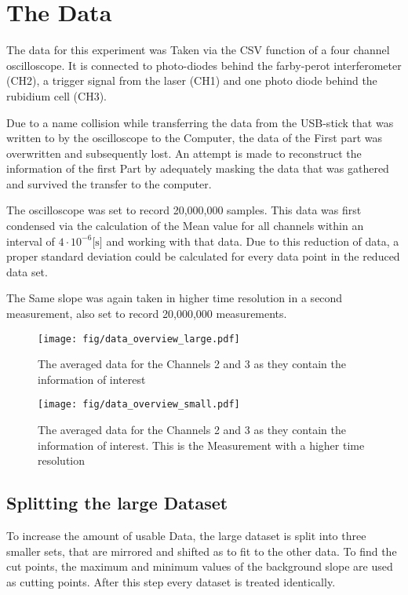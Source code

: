 \section{The Data}
The data for this experiment was Taken via the CSV function of a four channel oscilloscope. It is connected to photo-diodes behind the farby-perot
interferometer (CH2), a trigger signal from the laser (CH1) and one photo diode behind the rubidium cell (CH3).

Due to a name collision while transferring the data from the USB-stick that was written to by the oscilloscope to the Computer, the data of the First
part was overwritten and subsequently lost. An attempt is made to reconstruct the information of the first Part by adequately masking the data that
was gathered and survived the transfer to the computer.

The oscilloscope was set to record 20,000,000 samples. This data was first condensed via the calculation of the Mean value for all channels within an
interval of $4\cdot 10^{-6} \text{[s]}$ and working with that data. Due to this reduction of data, a proper standard deviation could be calculated for
every data point in the reduced data set.

The Same slope was again taken in higher time resolution in a second measurement, also set to record 20,000,000 measurements.

\begin{figure}[tb]
	\texttt{[image: fig/data\_overview\_large.pdf]}
	\caption{The averaged data for the Channels 2 and 3 as they contain the information of interest}
	\label{fig:data_overview_large}
\end{figure}

\begin{figure}[tb]
	\texttt{[image: fig/data\_overview\_small.pdf]}
	\caption{The averaged data for the Channels 2 and 3 as they contain the information of interest. This is the Measurement with a higher time
	resolution}
	\label{fig:data_overview_small}
\end{figure}

\subsection{Splitting the large Dataset}
To increase the amount of usable Data, the large dataset is split into three smaller sets, that are mirrored and shifted as to fit to the other data.
To find the cut points, the maximum and minimum values of the background slope are used as cutting points. After this step every dataset is treated
identically.

